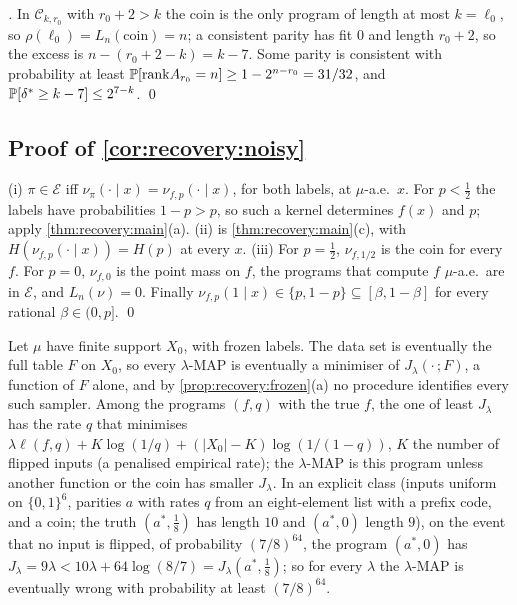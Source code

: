 \emph{.} In $\mathcal C_{k,r_0}$ with $r_0+2>k$ the coin is the only program of length at most $k=\ell_0$, so $\rho(\ell_0)=L_n(\text{coin})=n$; a consistent parity has fit $0$ and length $r_0+2$, so the excess is $n-(r_0+2-k)=k-7$. Some parity is consistent with probability at least $\mathbb{P}[\mathrm{rank}A_{r_0}=n]\ge1-2^{n-r_0}=31/32$, and $\mathbb{P}[\delta^*\ge k-7]\le2^{7-k}$. \qed

\subsection{Proof of \texorpdfstring{\cref{cor:recovery:noisy}}{the corollary on noisy computable functions}}\label{app:recovery:noisy}

(i) $\pi\in\mathcal E$ iff $\nu_\pi(\cdot\mid x)=\nu_{f,p}(\cdot\mid x)$, for both labels, at $\mu$-a.e.\ $x$. For $p<\frac12$ the labels have probabilities $1-p>p$, so such a kernel determines $f(x)$ and $p$; apply \cref{thm:recovery:main}(a). (ii) is \cref{thm:recovery:main}(c), with $H(\nu_{f,p}(\cdot\mid x))=H(p)$ at every $x$. (iii) For $p=\frac12$, $\nu_{f,1/2}$ is the coin for every $f$. For $p=0$, $\nu_{f,0}$ is the point mass on $f$, the programs that compute $f$ $\mu$-a.e.\ are in $\mathcal E$, and $L_n(\nu)=0$. Finally $\nu_{f,p}(1\mid x)\in\{p,1-p\}\subseteq[\beta,1-\beta]$ for every rational $\beta\in(0,p]$. \qed

\begin{remark}\label{rem:recovery:frozentable}
Let $\mu$ have finite support $X_0$, with frozen labels. The data set is eventually the full table $F$ on $X_0$, so every $\lambda$-MAP is eventually a minimiser of $J_\lambda(\cdot\,;F)$, a function of $F$ alone, and by \cref{prop:recovery:frozen}(a) no procedure identifies every such sampler. Among the programs $(f,q)$ with the true $f$, the one of least $J_\lambda$ has the rate $q$ that minimises $\lambda\ell(f,q)+K\log(1/q)+(|X_0|-K)\log(1/(1-q))$, $K$ the number of flipped inputs (a penalised empirical rate); the $\lambda$-MAP is this program unless another function or the coin has smaller $J_\lambda$. In an explicit class (inputs uniform on $\{0,1\}^6$, parities $a$ with rates $q$ from an eight-element list with a prefix code, and a coin; the truth $(a^*,\frac18)$ has length $10$ and $(a^*,0)$ length $9$), on the event that no input is flipped, of probability $(7/8)^{64}$, the program $(a^*,0)$ has $J_\lambda=9\lambda<10\lambda+64\log(8/7)=J_\lambda(a^*,\tfrac18)$; so for every $\lambda$ the $\lambda$-MAP is eventually wrong with probability at least $(7/8)^{64}$.
\end{remark}

